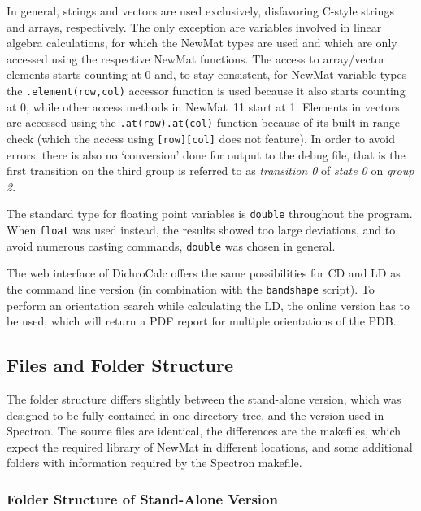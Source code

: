 \documentclass[11pt, letterpaper]{article}
\begin{document}
In general, strings and vectors are used exclusively, disfavoring C-style strings and arrays, respectively. The only exception are variables involved in linear algebra calculations, for which the NewMat types are used and which are only accessed using the respective NewMat functions. The access to array/vector elements starts counting at 0 and, to stay consistent, for NewMat variable types the \verb'.element(row,col)' accessor function is used because it also starts counting at 0, while other access methods in NewMat~11 start at 1. Elements in vectors are accessed using the \verb'.at(row).at(col)' function because of its built-in range check (which the access using \verb'[row][col]' does not feature). In order to avoid errors, there is also no `conversion' done for output to the debug file, that is the first transition on the third group is referred to as \emph{transition 0} of \emph{state 0} on \emph{group 2}.

The standard type for floating point variables is \verb'double' throughout the program. When \verb'float' was used instead, the results showed too large deviations, and to avoid numerous casting commands, \verb'double' was chosen in general.

The web interface of DichroCalc\cite{Bulheller:09:539} offers the same possibilities for CD and LD as the command line version (in combination with the \verb'bandshape' script). To perform an orientation search while calculating the LD, the online version has to be used, which will return a PDF report for multiple orientations of the PDB.




\subsection{Files and Folder Structure}

The folder structure differs slightly between the stand-alone version, which was designed to be fully contained in one directory tree, and the version used in Spectron. The source files are identical, the differences are the makefiles, which expect the required library of NewMat in different locations, and some additional folders with information required by the Spectron makefile.

\subsubsection{Folder Structure of Stand-Alone Version}
\end{document}
